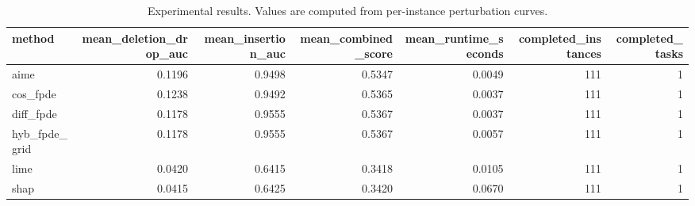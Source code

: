 \begin{table}[t]
\caption{Experimental results. Values are computed from per-instance perturbation curves.}
\label{tab:main_results_computed}
\centering
\begin{tabular}{lrrrrrr}
\toprule
method & mean\_deletion\_drop\_auc & mean\_insertion\_auc & mean\_combined\_score & mean\_runtime\_seconds & completed\_instances & completed\_tasks \\
\midrule
aime & 0.1196 & 0.9498 & 0.5347 & 0.0049 & 111 & 1 \\
cos\_fpde & 0.1238 & 0.9492 & 0.5365 & 0.0037 & 111 & 1 \\
diff\_fpde & 0.1178 & 0.9555 & 0.5367 & 0.0037 & 111 & 1 \\
hyb\_fpde\_grid & 0.1178 & 0.9555 & 0.5367 & 0.0057 & 111 & 1 \\
lime & 0.0420 & 0.6415 & 0.3418 & 0.0105 & 111 & 1 \\
shap & 0.0415 & 0.6425 & 0.3420 & 0.0670 & 111 & 1 \\
\bottomrule
\end{tabular}

\end{table}
